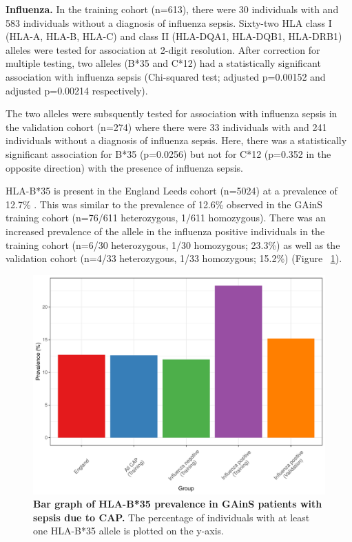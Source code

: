 \textbf{Influenza.} In the training cohort (n=613), there were 30 individuals with and 583 individuals without a diagnosis of influenza sepsis. Sixty-two HLA class I (HLA-A, HLA-B, HLA-C) and class II (HLA-DQA1, HLA-DQB1, HLA-DRB1) alleles were tested for association at 2-digit resolution. After correction for multiple testing, two alleles (B*35 and C*12) had a statistically significant association with influenza sepsis (Chi-squared test; adjusted p=0.00152 and adjusted p=0.00214 respectively). 

The two alleles were subsquently tested for association with influenza sepsis in the validation cohort (n=274) where there were 33 individuals with and 241 individuals without a diagnosis of influenza sepsis. Here, there was a statistically significant association for B*35 (p=0.0256) but not for C*12 (p=0.352 in the opposite direction) with the presence of influenza sepsis. 

HLA-B*35 is present in the England Leeds cohort (n=5024) at a prevalence of 12.7\% \parencite{AlleleFrequencies}. This was similar to the prevalence of 12.6\% observed in the GAinS training cohort (n=76/611 heterozygous, 1/611 homozygous). There was an increased prevalence of the allele in the influenza positive individuals in the training cohort (n=6/30 heterozygous, 1/30 homozygous; 23.3\%) as well as the validation cohort (n=4/33 heterozygous, 1/33 homozygous; 15.2\%) (Figure ~\ref{fig:bar-hla-b35}).

\FloatBarrier
\begin{figure}[htbp]
\centering
\includegraphics[scale=0.6]{./Results3/Images/bar_hla_b35.pdf}
\caption[Bar graph of HLA-B*35 prevalence]{\textbf{Bar graph of HLA-B*35 prevalence in GAinS patients with sepsis due to CAP.} The percentage of individuals with at least one HLA-B*35 allele is plotted on the y-axis.}
\label{fig:bar-hla-b35}
\end{figure}
\FloatBarrier

